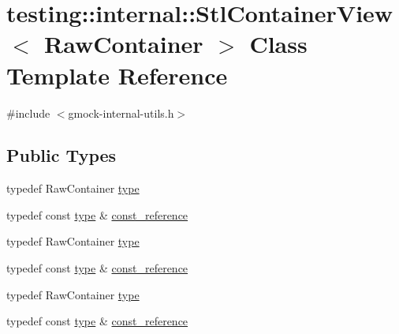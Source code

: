 \hypertarget{classtesting_1_1internal_1_1_stl_container_view}{}\section{testing\+::internal\+::Stl\+Container\+View$<$ Raw\+Container $>$ Class Template Reference}
\label{classtesting_1_1internal_1_1_stl_container_view}


{\ttfamily \#include $<$gmock-\/internal-\/utils.\+h$>$}

\subsection*{Public Types}
\begin{DoxyCompactItemize}
\item 
typedef Raw\+Container \mbox{\hyperlink{classtesting_1_1internal_1_1_stl_container_view_a2b2c63a6dcdbfe63fb0ee121ebf463ba}{type}}
\item 
typedef const \mbox{\hyperlink{classtesting_1_1internal_1_1_stl_container_view_a2b2c63a6dcdbfe63fb0ee121ebf463ba}{type}} \& \mbox{\hyperlink{classtesting_1_1internal_1_1_stl_container_view_a9cd4f6ed689b3938cdb7b3c4cbf1b36b}{const\+\_\+reference}}
\item 
typedef Raw\+Container \mbox{\hyperlink{classtesting_1_1internal_1_1_stl_container_view_a2b2c63a6dcdbfe63fb0ee121ebf463ba}{type}}
\item 
typedef const \mbox{\hyperlink{classtesting_1_1internal_1_1_stl_container_view_a2b2c63a6dcdbfe63fb0ee121ebf463ba}{type}} \& \mbox{\hyperlink{classtesting_1_1internal_1_1_stl_container_view_a9cd4f6ed689b3938cdb7b3c4cbf1b36b}{const\+\_\+reference}}
\item 
typedef Raw\+Container \mbox{\hyperlink{classtesting_1_1internal_1_1_stl_container_view_a2b2c63a6dcdbfe63fb0ee121ebf463ba}{type}}
\item 
typedef const \mbox{\hyperlink{classtesting_1_1internal_1_1_stl_container_view_a2b2c63a6dcdbfe63fb0ee121ebf463ba}{type}} \& \mbox{\hyperlink{classtesting_1_1internal_1_1_stl_container_view_a9cd4f6ed689b3938cdb7b3c4cbf1b36b}{const\+\_\+reference}}
\end{DoxyCompactItemize}
